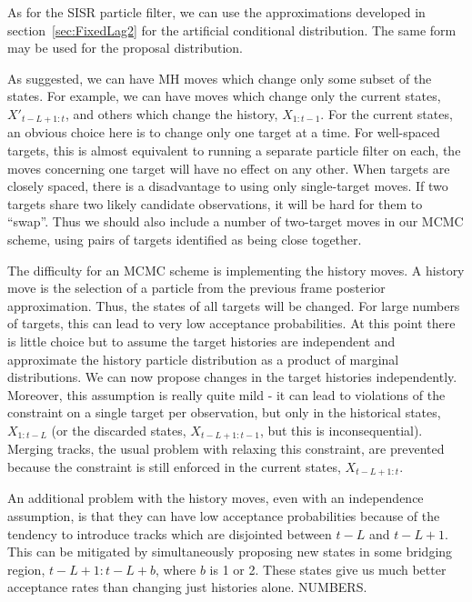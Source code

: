 As for the SISR particle filter, we can use the approximations developed in section~\ref{sec:FixedLag2} for the artificial conditional distribution. The same form may be used for the proposal distribution.

As suggested, we can have MH moves which change only some subset of the states. For example, we can have moves which change only the current states, $X'_{t-L+1:t}$, and others which change the history, $X_{1:t-1}$. For the current states, an obvious choice here is to change only one target at a time. For well-spaced targets, this is almost equivalent to running a separate particle filter on each, the moves concerning one target will have no effect on any other. When targets are closely spaced, there is a disadvantage to using only single-target moves. If two targets share two likely candidate observations, it will be hard for them to ``swap''. Thus we should also include a number of two-target moves in our MCMC scheme, using pairs of targets identified as being close together.

The difficulty for an MCMC scheme is implementing the history moves. A history move is the selection of a particle from the previous frame posterior approximation. Thus, the states of all targets will be changed. For large numbers of targets, this can lead to very low acceptance probabilities. At this point there is little choice but to assume the target histories are independent and approximate the history particle distribution as a product of marginal distributions. We can now propose changes in the target histories independently. Moreover, this assumption is really quite mild - it can lead to violations of the constraint on a single target per observation, but only in the historical states, $X_{1:t-L}$ (or the discarded states, $X_{t-L+1:t-1}$, but this is inconsequential). Merging tracks, the usual problem with relaxing this constraint, are prevented because the constraint is still enforced in the current states, $X_{t-L+1:t}$.

An additional problem with the history moves, even with an independence assumption, is that they can have low acceptance probabilities because of the tendency to introduce tracks which are disjointed between $t-L$ and $t-L+1$. This can be mitigated by simultaneously proposing new states in some bridging region, $t-L+1:t-L+b$, where $b$ is 1 or 2. These states give us much better acceptance rates than changing just histories alone. NUMBERS.



